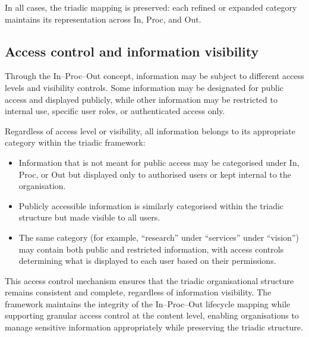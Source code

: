 \documentclass[11pt,a4paper]{article}
\begin{document}
In all cases, the triadic mapping is preserved: each refined or expanded category maintains its representation across In, Proc, and Out.

\subsection*{Access control and information visibility}

Through the In--Proc--Out concept, information may be subject to different access levels and visibility controls. Some information may be designated for public access and displayed publicly, while other information may be restricted to internal use, specific user roles, or authenticated access only.

Regardless of access level or visibility, all information belongs to its appropriate category within the triadic framework:
\begin{itemize}[noitemsep]
  \item Information that is not meant for public access may be categorised under In, Proc, or Out but displayed only to authorised users or kept internal to the organisation.
  \item Publicly accessible information is similarly categorised within the triadic structure but made visible to all users.
  \item The same category (for example, ``research'' under ``services'' under ``vision'') may contain both public and restricted information, with access controls determining what is displayed to each user based on their permissions.
\end{itemize}

This access control mechanism ensures that the triadic organisational structure remains consistent and complete, regardless of information visibility. The framework maintains the integrity of the In--Proc--Out lifecycle mapping while supporting granular access control at the content level, enabling organisations to manage sensitive information appropriately while preserving the triadic structure.
\end{document}
